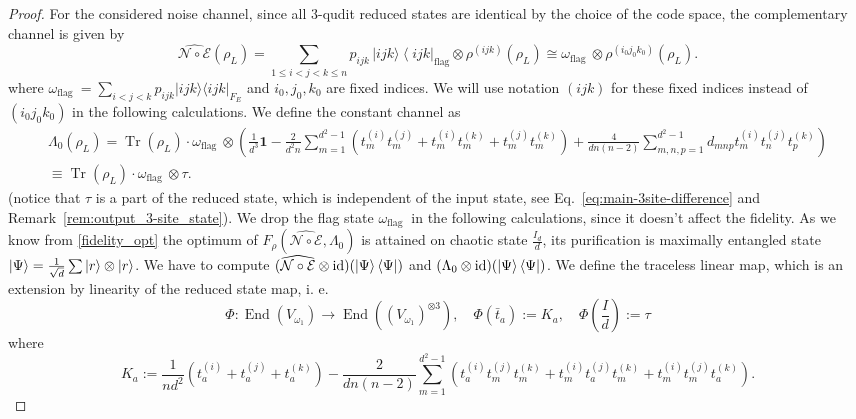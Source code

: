 \documentclass[10pt,twocolumn,superscriptaddress,aps,amsmath,amssymb,citeautoscript,floatfix,prx]{revtex4-2}
\theoremstyle{plain}
\theoremstyle{plain}
\theoremstyle{plain}
\theoremstyle{plain}
\theoremstyle{plain}
\theoremstyle{plain}
\theoremstyle{plain}
\theoremstyle{definition}
\theoremstyle{plain}
\begin{document}
\begin{appendix}
\begin{proof}
    For the considered noise channel, since all $3$-qudit reduced states are identical by the choice of the code space, the complementary channel is given by
    \[
        \widehat{\mathcal{N} \circ \mathcal{E}}\left(\rho_L\right)= \sum_{1 \leq i<j<k \leq n} p_{i j k}\,|i j k\rangle\left\langle i j k\right|_{\text{flag}} \otimes \rho^{(ijk)}\left(\rho_L\right)\cong \omega_{\text{flag }} \otimes \rho^{(i_0j_0k_0)}\left(\rho_L\right).
    \]
    where $\omega_{\text {flag }}=\sum_{i<j<k} p_{i j k}|i j k\rangle\langle i j k|_{F_E}$ and $i_0, j_0, k_0$ are fixed indices. We will use notation $(i j k)$ for these fixed indices instead of $(i_0 j_0 k_0)$ in the following calculations.
    We define the constant channel as
    \begin{equation}\label{eq:constant_channel_3site}
        \begin{gathered}
            \Lambda_0(\rho_L)=\operatorname{Tr}(\rho_L)\cdot\omega_{\text{flag }} \otimes \left(\frac{1}{d^3} \mathbf{1}-\frac{2}{d^2 n} \sum_{m=1}^{d^2-1}\left(t_m^{(i)} t_m^{(j)}+t_m^{(i)} t_m^{(k)}+t_m^{(j)} t_m^{(k)}\right)+\frac{4}{d n(n-2)} \sum_{m, n, p=1}^{d^2-1} d_{m n p} t_m^{(i)} t_n^{(j)} t_p^{(k)}\right)\\\equiv \operatorname{Tr}(\rho_L)\cdot \omega_{\text{flag }} \otimes \tau.
        \end{gathered}
    \end{equation}
    (notice that $\tau$ is a part of the reduced state, which is independent of the input state, see Eq.~\eqref{eq:main-3site-difference} and Remark~\ref{rem:output_3-site_state}). We drop the flag state $\omega_{\text{flag }}$ in the following calculations, since it doesn't affect the fidelity.
    As we know from \ref{fidelity_opt} the optimum of $F_{\rho}(\widehat{\mathcal{N} \circ \mathcal{E}}, \Lambda_0)$ is attained on chaotic state $\frac{I_d}{d}$, its purification is maximally entangled state $\ket{\Psi}=\frac{1}{\sqrt{d}}\sum |r\rangle \otimes|r\rangle $. We have to compute $(\widehat{\mathcal{N} \circ \mathcal{E}} \otimes \mathrm{id})(\ket{\Psi}\bra{\Psi})$ and $(\Lambda_0 \otimes \mathrm{id})(\ket{\Psi}\bra{\Psi})$.
    We define the traceless linear map, which is an extension by linearity of the reduced state map, i. e.
    \[
        \Phi:  \operatorname{End}\left(V_{\omega_1}\right) \rightarrow \operatorname{End}\left(\left(V_{\omega_1}\right)^{\otimes 3}\right), \quad \Phi\left(\bar{t}_a\right):=K_a, \quad\Phi\left(\frac{I}{d}\right):=\tau
    \]
    where
    \[
        K_a:=\frac{1}{n d^2}\left(t_a^{(i)}+t_a^{(j)}+t_a^{(k)}\right)-\frac{2}{d n(n-2)} \sum_{m=1}^{d^2-1}\left(t_a^{(i)} t_m^{(j)} t_m^{(k)}+t_m^{(i)} t_a^{(j)} t_m^{(k)}+t_m^{(i)} t_m^{(j)} t_a^{(k)}\right).
\]
\end{proof}
\end{appendix}
\end{document}
